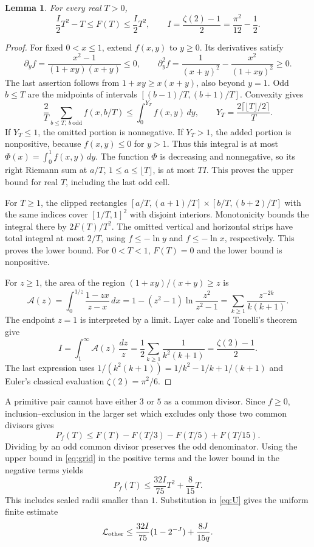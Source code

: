 \documentclass[11pt,a4paper]{article}
\numberwithin{equation}{section}
\newtheorem{lemma}[theorem]{Lemma}
\theoremstyle{remark}
\newcommand{\odd}{\mathrm{odd}}
\begin{document}
\begin{lemma}\label{lem:grid}
For every real $T>0$,
\begin{equation}\label{eq:grid}
                   \frac I2T^2-T\le F(T)\le\frac I2T^2,
 \qquad I=\frac{\zeta(2)-1}{2}=\frac{\pi^2}{12}-\frac12.
\end{equation}
\end{lemma}
\begin{proof}
For fixed $0<x\le1$, extend $f(x,y)$ to $y\ge0$. Its derivatives satisfy
\[
 \partial_yf=\frac{x^2-1}{(1+xy)(x+y)}\le0,\qquad
 \partial_y^2f=\frac1{(x+y)^2}-\frac{x^2}{(1+xy)^2}\ge0.
\]
The last assertion follows from $1+xy\ge x(x+y)$, also beyond $y=1$.
Odd $b\le T$ are the midpoints of intervals
$[(b-1)/T,(b+1)/T]$. Convexity gives
\[
 \frac2T\sum_{b\le T,\ b\ \odd} f(x,b/T)
 \le\int_0^{Y_T}f(x,y)\,dy,\qquad
 Y_T=\frac{2\lceil\lfloor T\rfloor/2\rceil}{T}.
\]
If $Y_T\le1$, the omitted portion is nonnegative.
If $Y_T>1$, the added portion is nonpositive, because $f(x,y)\le0$
for $y>1$. Thus this integral is at most
$\Phi(x)=\int_0^1f(x,y)\,dy$.
The function $\Phi$ is decreasing and nonnegative, so its right
Riemann sum at $a/T$, $1\le a\le\lfloor T\rfloor$, is at most $TI$.
This proves the upper bound for real $T$, including the last odd cell.

For $T\ge1$, the clipped rectangles
$[a/T,(a+1)/T]\times[b/T,(b+2)/T]$ with the same indices cover
$[1/T,1]^2$ with disjoint interiors. Monotonicity bounds the integral
there by $2F(T)/T^2$.
The omitted vertical and horizontal strips have total integral at most
$2/T$, using $f\le-\ln y$ and $f\le-\ln x$, respectively.
This proves the lower bound. For $0<T<1$, $F(T)=0$ and the lower bound
is nonpositive.

For $z\ge1$, the area of the region $(1+xy)/(x+y)\ge z$ is
\[
 \mathcal A(z)=\int_0^{1/z}\frac{1-zx}{z-x}\,dx
 =1-(z^2-1)\ln\frac{z^2}{z^2-1}
 =\sum_{k\ge1}\frac{z^{-2k}}{k(k+1)}.
\]
The endpoint $z=1$ is interpreted by a limit.
Layer cake and Tonelli's theorem give
\[
 I=\int_1^\infty\mathcal A(z)\,\frac{dz}{z}
   =\frac12\sum_{k\ge1}\frac1{k^2(k+1)}
   =\frac{\zeta(2)-1}{2}.
\]
The last expression uses
$1/(k^2(k+1))=1/k^2-1/k+1/(k+1)$ and Euler's classical
evaluation $\zeta(2)=\pi^2/6$.
\end{proof}

A primitive pair cannot have either $3$ or $5$ as a common divisor.
Since $f\ge0$, inclusion--exclusion in the larger set which excludes
only those two common divisors gives
\[
 P_f(T)\le F(T)-F(T/3)-F(T/5)+F(T/15).
\]
Dividing by an odd common divisor preserves the odd denominator.
Using the upper bound in \eqref{eq:grid} in the positive terms and
the lower bound in the negative terms yields
\[
 P_f(T)\le\frac{32I}{75}T^2+\frac8{15}T.
\]
This includes scaled radii smaller than $1$.
Substitution in \eqref{eq:U} gives the uniform finite estimate
\begin{equation}\label{eq:tail}
 \mathcal L_{\rm other}\le
 \frac{32I}{75}(1-2^{-J})+\frac{8J}{15q}.
\end{equation}
\end{document}
